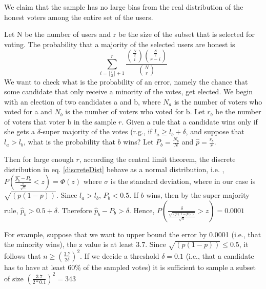 \documentclass[]{paper}
\newtheorem{lemma}{Lemma}
\begin{document}
We claim that the sample has no large bias from the real distribution of the honest voters among the entire set of the users.


Let N be the number of users and r be the size of the subset that is selected for voting. The probability that a majority of the selected users are honest is  
\begin{equation} \label{discreteDist}
\sum_{i=\lfloor{\frac{r}{2}\rfloor}+1}^{r}\frac{\binom{\frac{N}{2}}{i}\binom{\frac{N}{2}}{r-i}}{\binom{N}{r}}
\end{equation}
We want to check what is the probability of an error, namely the chance that some candidate that only receive a minority of the votes, get elected. 
We begin with an election of two candidates a and b, where $N_a$ is the number of voters who voted for a and $N_b$ is the number of voters who voted for b. Let $r_b$ be the number of voters that voter b in the sample $r$. 
Given a rule that a candidate wins only if she gets a $\delta$-super majority of the votes (r.g., if  $l_a\geq l_b + \delta$, and suppose that $l_a > l_b$, what is the probability that $b$ wins?  Let $P_b = \frac{N_b}{N}$ and $\hat{p} = \frac{r_b}{r}$. 


Then for large enough $r$, according the central limit theorem, the discrete distribution in eq. \ref{discreteDist} behave as a normal distribution, i.e. , $P(\frac{\hat{p_b} - P_b}{\frac{\sigma}{\sqrt{n}}}<z)= \Phi(z)$ where $\sigma$ is the standard deviation, where in our case is $\sqrt{(p(1-p))}$. Since $l_a>l_b$, $P_b<0.5$. If $b$ wins, then by the super majority rule, $\hat{p}_b>0.5 +\delta$. Therefore $\hat{p}_b - P_b >\delta$.  Hence, $P\left( \frac{\delta}{\frac{\sqrt{(p(1-p))}}{\sqrt{n}}}>z\right)  = 0.0001$

For example, suppose that we want to upper bound the error by 0.0001  (i.e., that the minority wins), the z value is at least 3.7. Since $\sqrt{(p(1-p))}\leq 0.5$, it follows that $n \geq \left( \frac{3.7}{2\delta}\right) ^2$. If we decide a threshold $\delta = 0.1$ (i.e., that a candidate has to have at least 60\% of the sampled votes) it is sufficient to sample a subset of size $\left( \frac{3.7}{2*0.1}\right) ^2 = 343$


\end{document}
